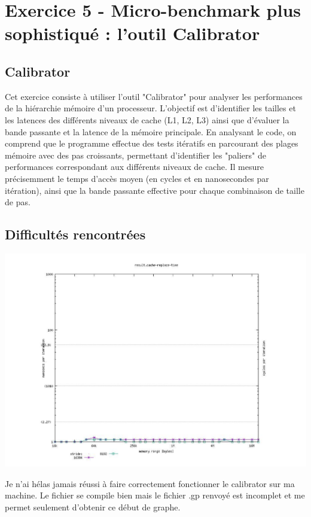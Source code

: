 \documentclass{rapport}
\begin{document}
    \section{Exercice 5 - Micro-benchmark plus sophistiqué : l’outil Calibrator}
      
      \subsection{Calibrator}
        
        Cet exercice consiste à utiliser l'outil "Calibrator" pour analyser les performances de la hiérarchie mémoire d’un processeur. L’objectif est d’identifier les tailles et les latences des différents niveaux de cache (L1, L2, L3) ainsi que d’évaluer la bande passante et la latence de la mémoire principale. En analysant le code, on comprend que le programme effectue des tests itératifs en parcourant des plages mémoire avec des pas croissants, permettant d’identifier les "paliers" de performances correspondant aux différents niveaux de cache.
        Il mesure précisemment le temps d'accès moyen (en cycles et en nanosecondes par itération), ainsi que la bande passante effective pour chaque combinaison de taille de pas.

      \subsection{Difficultés rencontrées}

        \includegraphics[width=15cm]{img/result.cache-replace-time.pdf}

        Je n'ai hélas jamais réussi à faire correctement fonctionner le calibrator sur ma machine. Le fichier se compile bien mais le fichier .gp renvoyé est incomplet et me permet seulement d'obtenir ce début de graphe.
        
\end{document}
